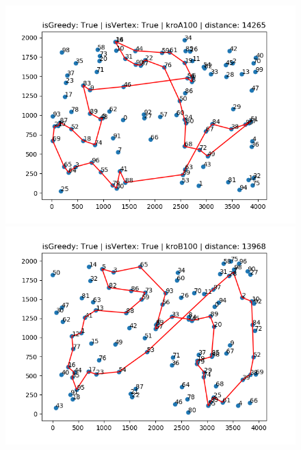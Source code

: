\documentclass{article}
\begin{document}
\begin{figure}[h!]
  \centering
  \begin{minipage}[b]{0.5\textwidth}
    \includegraphics[width=\textwidth]{random_kroA100_V-True_G-True.png}
  \end{minipage}

  \begin{minipage}[b]{0.5\textwidth}
    \includegraphics[width=\textwidth]{random_kroB100_V-True_G-True.png}
  \end{minipage}
  
\end{figure}
    
\end{document}
